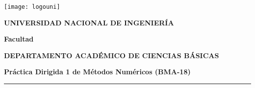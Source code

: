 


\providecommand{\faculty}{Facultad}
\noindent\parbox[c]{.18\textwidth}{\texttt{[image: logouni]}}\hfill
\parbox[c]{1\textwidth}{\raggedright%
    {\large\textbf{UNIVERSIDAD NACIONAL DE INGENIERÍA} \par\smallskip}
    {\large\textbf{\faculty} \par\smallskip}
    {\large\textbf{DEPARTAMENTO ACADÉMICO DE CIENCIAS BÁSICAS} \par\smallskip}
}

\begin{center}\bfseries\large
    Práctica Dirigida 1 de Métodos Numéricos (BMA-18)
\end{center}

\vspace{-0.5cm}

\hrulefill
\vspace{-2.5mm}

\rule{16.5cm}{0.8mm}


